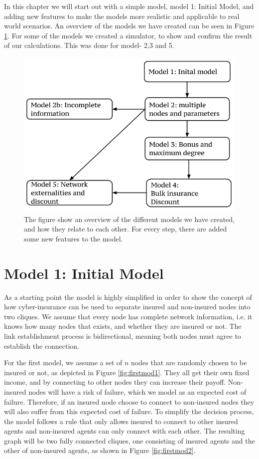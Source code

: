 In this chapter we will start out with a simple model, model 1: Initial Model, and adding new features to make the models more realistic and applicable to real world scenarios. An overview of the models we have created can be seen in Figure \ref{fig:Overview-of-models}. For some of the models we created a simulator, to show and confirm the result of our calculations. This was done for model- 2,3 and 5. 
\begin{figure}[h]
\centering
  \includegraphics[width=0.9\linewidth]{../Figures/modeloverview.png}
  \caption{\label{fig:Overview-of-models} The figure show an overview of the different models we have created, and how they relate to each other. For every step, there are added some new features to the model.}

\end{figure}

\section{Model 1: Initial Model \label{section:verysimplemodel}}

As a starting point the model is highly simplified in order to show the concept of how cyber-insurance can be used to separate insured and non-insured nodes into two cliques. We assume that every node has complete network information, i.e. it knows how many nodes that exists, and whether they are insured or not. The link establishment process is bidirectional, meaning both nodes must agree to establish the connection.

For the first model, we assume a set of $n$ nodes that are randomly chosen to be insured or not, as depicted in Figure \ref{fig:firstmod1}. They all get their own fixed income, and by connecting to other nodes they can increase their payoff. Non-insured nodes will have a risk of failure, which we model as an expected cost of failure. Therefore, if an insured node choose to connect to non-insured nodes they will also suffer from this expected cost of failure. To simplify the decision process, the model follows a rule that only allows insured to connect to other insured agents and non-insured agents can only connect with each other. The resulting graph will be two fully connected cliques, one consisting of insured agents and the other of non-insured agents, as shown in Figure  \ref{fig:firstmod2}. 

